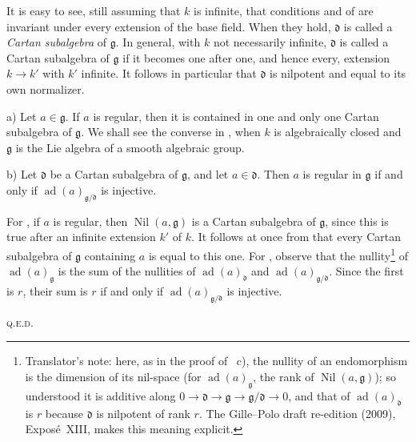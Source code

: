 It is easy to see, still assuming that \(k\) is infinite, that
conditions  and  of  are invariant under every extension
of the base field. When they hold, \(\mathfrak d\) is called a
\emph{Cartan subalgebra} of \(\mathfrak g\). In general, with \(k\)
not necessarily infinite, \(\mathfrak d\) is called a Cartan
subalgebra of \(\mathfrak g\) if it becomes one after one, and hence
every, extension \(k\to k'\) with \(k'\) infinite. It follows in
particular that \(\mathfrak d\) is nilpotent and equal to its own
normalizer.

\begin{proposition}
\textup{a)} Let \(a\in\mathfrak g\). If \(a\) is regular, then it is
contained in one and only one Cartan subalgebra of \(\mathfrak g\).
We shall see the converse in , when \(k\) is algebraically
closed and \(\mathfrak g\) is the Lie algebra of a smooth algebraic
group.

\textup{b)} Let \(\mathfrak d\) be a Cartan subalgebra of
\(\mathfrak g\), and let \(a\in\mathfrak d\). Then \(a\) is regular
in \(\mathfrak g\) if and only if
\(\operatorname{ad}(a)_{\mathfrak g/\mathfrak d}\) is injective.
\end{proposition}

For , if \(a\) is regular, then
\(\operatorname{Nil}(a,\mathfrak g)\) is a Cartan subalgebra of
\(\mathfrak g\), since this is true after an infinite extension
\(k'\) of \(k\). It follows at once from  that every Cartan
subalgebra of \(\mathfrak g\) containing \(a\) is equal to this one.
For , observe that the nullity\footnote{Translator's
note: here, as in the proof of ~c), the
nullity of an endomorphism is the dimension of its nil-space (for
\(\operatorname{ad}(a)_{\mathfrak g}\), the rank of
\(\operatorname{Nil}(a,\mathfrak g)\)); so understood it is additive along
\(0\to\mathfrak d\to\mathfrak g\to\mathfrak g/\mathfrak d\to0\), and that
of \(\operatorname{ad}(a)_{\mathfrak d}\) is \(r\) because \(\mathfrak d\)
is nilpotent of rank \(r\). The Gille--Polo draft re-edition (2009),
Exposé~XIII, makes this meaning explicit.} of
\(\operatorname{ad}(a)_{\mathfrak g}\) is the sum of the nullities of
\(\operatorname{ad}(a)_{\mathfrak d}\) and
\(\operatorname{ad}(a)_{\mathfrak g/\mathfrak d}\). Since the first
is \(r\), their sum is \(r\) if and only if
\(\operatorname{ad}(a)_{\mathfrak g/\mathfrak d}\) is injective.
\par\hfill\textsc{q.e.d.}

